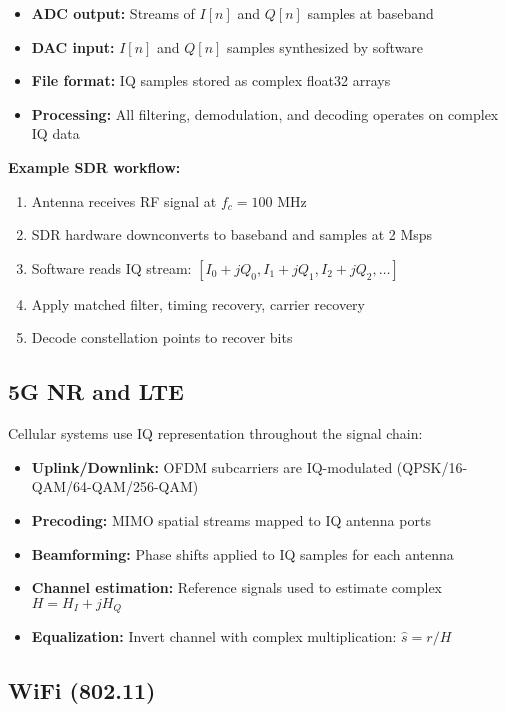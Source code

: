 \begin{itemize}
\item \textbf{ADC output:} Streams of $I[n]$ and $Q[n]$ samples at baseband
\item \textbf{DAC input:} $I[n]$ and $Q[n]$ samples synthesized by software
\item \textbf{File format:} IQ samples stored as complex float32 arrays
\item \textbf{Processing:} All filtering, demodulation, and decoding operates on complex IQ data
\end{itemize}

\textbf{Example SDR workflow:}
\begin{enumerate}
\item Antenna receives RF signal at $f_c = 100$ MHz
\item SDR hardware downconverts to baseband and samples at 2 Msps
\item Software reads IQ stream: $[I_0+jQ_0, I_1+jQ_1, I_2+jQ_2, \ldots]$
\item Apply matched filter, timing recovery, carrier recovery
\item Decode constellation points to recover bits
\end{enumerate}

\subsection{5G NR and LTE}

Cellular systems use IQ representation throughout the signal chain:

\begin{itemize}
\item \textbf{Uplink/Downlink:} OFDM subcarriers are IQ-modulated (QPSK/16-QAM/64-QAM/256-QAM)
\item \textbf{Precoding:} MIMO spatial streams mapped to IQ antenna ports
\item \textbf{Beamforming:} Phase shifts applied to IQ samples for each antenna
\item \textbf{Channel estimation:} Reference signals used to estimate complex $H = H_I + jH_Q$
\item \textbf{Equalization:} Invert channel with complex multiplication: $\hat{s} = r/H$
\end{itemize}

\subsection{WiFi (802.11)}

